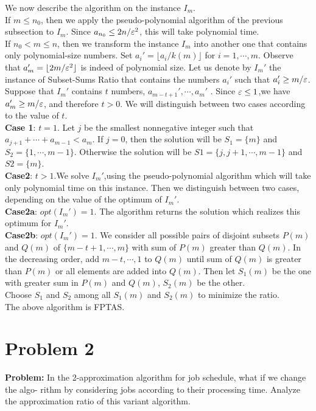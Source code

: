 \documentclass[12pt]{article}
\begin{document}
We now describe the algorithm on the instance $I_m$.\\
If $m\leq n_0$, then we apply the pseudo-polynomial algorithm of the previous subsection to $I_m$. Since $a_{n_0}\leq 2n/\varepsilon^2$, this will take polynomial time.\\
If $n_0 < m \leq n$, then we transform the instance $I_m$ into another one that
contains only polynomial-size numbers. Set $a_i' = \lfloor a_i/k(m) \rfloor$ for $i = 1,\cdots,m$.
Observe that $a_m' = \lfloor 2m/\varepsilon^2 \rfloor$ is indeed of polynomial size. Let us denote by $I_m'$
the instance of Subset-Sums Ratio that contains the numbers $a_i'$ such that
$a_i'\geq m/\varepsilon$. Suppose that $I_m'$ contains $t$ numbers, $a_{m-t+1}',\cdots,a_m'$ . Since $\varepsilon\leq 1$,we have $a_m' \geq m/\varepsilon$, and therefore $t > 0$. We will distinguish between two cases according to the value of $t$.\\
\textbf{Case 1}: $t = 1$. Let $j$ be the smallest nonnegative integer such that $a_{j+1}+\cdots+ a_{m−1} < a_m$. If $j= 0$, then the solution will be $S_1 = \{m\}$ and $S_2 = \{1,\cdots,m-1\}$. Otherwise the solution will be $S1 =\{j,j+1,\cdots,m-1\}$ and $S2 =\{m\}$.\\
\textbf{Case2}: $t>1$.We solve $I_m'$,using the pseudo-polynomial algorithm which will take only polynomial time on this instance. Then we distinguish between two cases, depending on the value of the optimum of $I_m'$.\\
\textbf{Case2a}: $opt(I_m')=1$. The algorithm returns the solution which realizes this optimum for $I_m'$.\\
\textbf{Case2b}: $opt(I_m')=1$. We consider all possible pairs of disjoint subsets $P(m)$ and $Q(m)$ of $\{m-t+1, \cdots, m\}$ with sum of $P(m)$ greater than $Q(m)$. In the decreasing order, add $m-t, \cdots, 1$ to $Q(m)$ until sum of $Q(m)$ is greater than $P(m)$ or all elements are added into $Q(m)$. Then let $S_1(m)$ be the one with greater sum in $P(m)$ and $Q(m)$, $S_2(m)$ be the other.\\
Choose $S_1$ and $S_2$ among all $S_1(m)$ and $S_2(m)$ to minimize the ratio.\\

The above algorithm is FPTAS.
\section*{Problem 2}
\textbf{Problem:} In the 2-approximation algorithm for job schedule, what if we change the algo- rithm by considering jobs according to their processing time. Analyze the approximation ratio of this variant algorithm.\\
\end{document}
